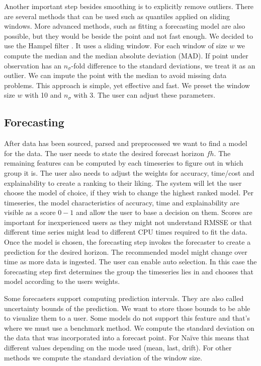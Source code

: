Another important step besides smoothing is to explicitly remove outliers. There are several methods that can be used such as quantiles applied on sliding windows. More advanced methods, such as fitting a forecasting model are also possible, but they would be beside the point and not fast enough. We decided to use the Hampel filter \cite{HAMPEL}. It uses a sliding window. For each window of size $w$ we compute the median and the median absolute deviation (MAD). If point under observation has an $n_\sigma$-fold difference to the standard deviations, we treat it as an outlier. We can impute the point with the median to avoid missing data problems. This approach is simple, yet effective and fast. We preset the window size $w$ with 10 and $n_\sigma$ with 3. The user can adjust these parameters.

\subsection{Forecasting}

After data has been sourced, parsed and preprocessed we want to find a model for the data. The user needs to state the desired forecast horizon $fh$. The remaining features can be computed by each timeseries to figure out in which group it is. The user also needs to adjust the weights for accuracy, time/cost and explainability to create a ranking to their liking. The system will let the user choose the model of choice, if they wish to change the highest ranked model. Per timeseries, the model characteristics of accuracy, time and explainability are visible as a score $0-1$ and allow the user to base a decision on them. Scores are important for inexperienced users as they might not understand RMSSE or that different time series might lead to different CPU times required to fit the data. Once the model is chosen, the forecasting step invokes the forecaster to create a prediction for the desired horizon. The recommended model might change over time as more data is ingested. The user can enable auto selection. In this case the forecasting step first determines the group the timeseries lies in and chooses that model according to the users weights.

Some forecasters support computing prediction intervals. They are also called uncertainty bounds of the prediction. We want to store those bounds to be able to visualize them to a user. Some models do not support this feature and that's where we must use a benchmark method. We compute the standard deviation on the data that was incorporated into a forecast point. For Na\"ive this means that different values depending on the mode used (mean, last, drift). For other methods we compute the standard deviation of the window size.

